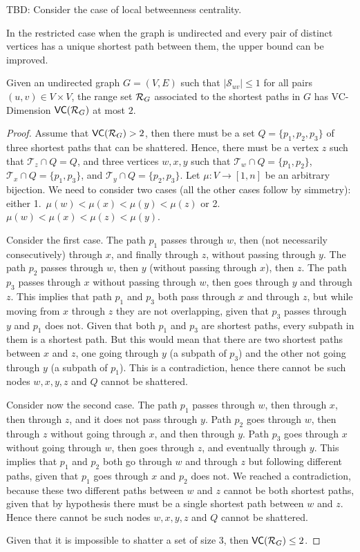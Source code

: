 \XXX TBD: Consider the case of local betweenness centrality. \MR

In the restricted case when the graph is undirected and every pair of distinct vertices
has a unique shortest path between them, the upper bound can be improved.
\begin{lemma}\label{lem:vcdimuppboundunique}
  Given an undirected graph $G=(V,E)$ such that $|\mathcal{S}_{uv}|\le1$ for all
  pairs $(u,v)\in V\times V$, the range set $\mathcal{R}_G$ associated to the
  shortest paths in $G$ has VC-Dimension $\mathsf{VC}(\mathcal{R}_G)$ at most $2$.
\end{lemma}

\begin{proof}
  Assume that $\mathsf{VC}(\mathcal{R}_G)>2$, then there must be a set $Q=\{p_1,p_2,p_3\}$ of three
  shortest paths that can be shattered. Hence, there must be a vertex $z$ such that
  $\mathcal{T}_{z}\cap Q=Q$, and three vertices $w,x,y$ such
  that $\mathcal{T}_{w}\cap Q=\{p_1,p_2\}$, $\mathcal{T}_{x}\cap
  Q=\{p_1,p_3\}$, and $\mathcal{T}_{y}\cap Q=\{p_2,p_3\}$. Let $\mu:V\rightarrow
  [1,n]$ be an arbitrary bijection. We need to consider two
  cases (all the other cases follow by simmetry): either
  1.~$\mu(w)<\mu(x)<\mu(y)<\mu(z)$ or 2.~$\mu(w)<\mu(x)<\mu(z)<\mu(y)$.

  Consider the first case. The path $p_1$ passes through $w$, then (not
  necessarily consecutively) through $x$, and finally through $z$, without
  passing through $y$. The path $p_2$ passes through $w$, then $y$ (without
  passing through $x$), then $z$. The path $p_3$ passes through $x$ without
  passing through $w$, then goes through $y$ and through $z$. This implies that
  path $p_1$ and $p_3$ both pass through $x$ and through $z$, but while moving
  from $x$ through $z$ they are not overlapping, given that $p_3$ passes through
  $y$ and $p_1$ does not. Given that both $p_1$ and $p_3$ are shortest
  paths, every subpath in them is a shortest path. But this would mean that
  there are two shortest paths between $x$ and $z$, one going through $y$
  (a subpath of $p_3$) and the other not going through $y$ (a subpath of $p_1$).
  This is a contradiction, hence there cannot be such nodes $w,x,y,z$ and $Q$
  cannot be shattered.

  Consider now the second case. The path $p_1$ passes through $w$, then through
  $x$, then through $z$, and it does not pass through $y$. Path $p_2$ goes
  through $w$, then through $z$ without going through $x$, and then through $y$.
  Path $p_3$ goes through $x$ without going through $w$, then goes through $z$,
  and eventually through $y$. This implies that $p_1$ and $p_2$ both go through
  $w$ and through $z$ but following different paths, given that $p_1$ goes
  through $x$ and $p_2$ does not. We reached a contradiction, because these
  two different paths between $w$ and $z$ cannot be both shortest paths, given
  that by hypothesis there must be a single shortest path between $w$ and $z$.
  Hence there cannot be such nodes $w,x,y,z$ and $Q$ cannot be shattered.  

  Given that it is impossible to shatter a set of size $3$, then
  $\mathsf{VC}(\mathcal{R}_G)\le 2$.
\end{proof}


